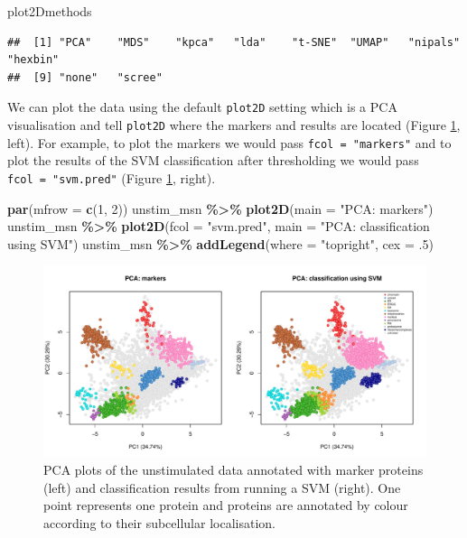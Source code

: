 \documentclass[9pt,a4paper,]{extarticle}
\newenvironment{Shaded}{\begin{snugshade}}{\end{snugshade}}
\newcommand{\AttributeTok}[1]{\textcolor[rgb]{0.13,0.29,0.53}{#1}}
\newcommand{\DecValTok}[1]{\textcolor[rgb]{0.00,0.00,0.81}{#1}}
\newcommand{\FunctionTok}[1]{\textcolor[rgb]{0.13,0.29,0.53}{\textbf{#1}}}
\newcommand{\NormalTok}[1]{#1}
\newcommand{\SpecialCharTok}[1]{\textcolor[rgb]{0.81,0.36,0.00}{\textbf{#1}}}
\newcommand{\StringTok}[1]{\textcolor[rgb]{0.31,0.60,0.02}{#1}}
\begin{document}
\begin{Shaded}
\begin{Highlighting}[]
\NormalTok{plot2Dmethods}
\end{Highlighting}
\end{Shaded}

\begin{verbatim}
##  [1] "PCA"    "MDS"    "kpca"   "lda"    "t-SNE"  "UMAP"   "nipals" "hexbin"
##  [9] "none"   "scree"
\end{verbatim}

We can plot the data using the default \texttt{plot2D} setting which is a PCA
visualisation and tell \texttt{plot2D} where the markers and results are located
(Figure \ref{fig:svm-pca-res}, left). For example, to plot the markers we would
pass \texttt{fcol\ =\ "markers"} and to plot the results of the SVM classification after
thresholding we would pass \texttt{fcol\ =\ "svm.pred"} (Figure \ref{fig:svm-pca-res}, right).

\begin{Shaded}
\begin{Highlighting}[]
\FunctionTok{par}\NormalTok{(}\AttributeTok{mfrow =} \FunctionTok{c}\NormalTok{(}\DecValTok{1}\NormalTok{, }\DecValTok{2}\NormalTok{))}
\NormalTok{unstim\_msn }\SpecialCharTok{\%\textgreater{}\%} 
  \FunctionTok{plot2D}\NormalTok{(}\AttributeTok{main =} \StringTok{"PCA: markers"}\NormalTok{)}
\NormalTok{unstim\_msn }\SpecialCharTok{\%\textgreater{}\%} 
  \FunctionTok{plot2D}\NormalTok{(}\AttributeTok{fcol =} \StringTok{"svm.pred"}\NormalTok{, }\AttributeTok{main =} \StringTok{"PCA: classification using SVM"}\NormalTok{)}
\NormalTok{unstim\_msn }\SpecialCharTok{\%\textgreater{}\%} 
  \FunctionTok{addLegend}\NormalTok{(}\AttributeTok{where =} \StringTok{"topright"}\NormalTok{, }\AttributeTok{cex =}\NormalTok{ .}\DecValTok{5}\NormalTok{)}
\end{Highlighting}
\end{Shaded}

\begin{figure}[H]

{\centering \includegraphics[width=0.9\linewidth,]{figs/svm_pca} 

}

\caption{PCA plots of the unstimulated data annotated with marker proteins (left) and classification results from running a SVM (right). One point represents one protein and proteins are annotated by colour according to their subcellular localisation.}\label{fig:svm-pca-res}
\end{figure}
\end{document}
